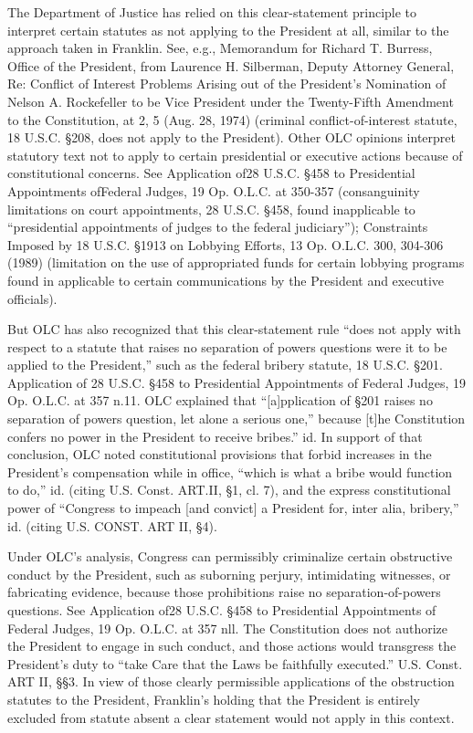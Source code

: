 The Department of Justice has relied on this clear-statement principle to interpret certain statutes as not applying to the President at all, similar to the approach taken in Franklin.
See, e.g., Memorandum for Richard T. Burress, Office of the President, from Laurence H. Silberman, Deputy Attorney General, Re: Conflict of Interest Problems Arising out of the President's Nomination of Nelson A. Rockefeller to be Vice President under the Twenty-Fifth Amendment to the Constitution, at 2, 5 (Aug. 28, 1974) (criminal conflict-of-interest statute, 18 U.S.C. \S 208, does not apply to the President).
Other OLC opinions interpret statutory text not to apply to certain presidential or executive actions because of constitutional concerns.
See Application of28 U.S.C. \S 458 to Presidential Appointments ofFederal Judges, 19 Op. O.L.C. at 350-357 (consanguinity limitations on court appointments, 28 U.S.C. \S 458, found inapplicable to “presidential appointments of judges to the federal judiciary”);
Constraints Imposed by 18 U.S.C. \S 1913 on Lobbying Efforts, 13 Op. O.L.C. 300, 304-306 (1989) (limitation on the use of appropriated funds for certain lobbying programs found in applicable to certain communications by the President and executive officials).

But OLC has also recognized that this clear-statement rule “does not apply with respect to a statute that raises no separation of powers questions were it to be applied to the President,” such as the federal bribery statute, 18 U.S.C. \S 201.
Application of 28 U.S.C. \S 458 to Presidential Appointments of Federal Judges, 19 Op. O.L.C. at 357 n.11. OLC explained that “[a]pplication of \S 201 raises no separation of powers question, let alone a serious one,” because [t]he Constitution confers no power in the President to receive bribes.” id.
In support of that conclusion, OLC noted constitutional provisions that forbid increases in the President’s compensation while in office, “which is what a bribe would function to do,” id. (citing U.S. Const. ART.II, \S 1, cl. 7), and the express constitutional power of “Congress to impeach [and convict] a President for, inter alia, bribery,” id. (citing U.S. CONST. ART II, \S 4).

Under OLC’s analysis, Congress can permissibly criminalize certain obstructive conduct by the President, such as suborning perjury, intimidating witnesses, or fabricating evidence, because those prohibitions raise no separation-of-powers questions.
See Application of28 U.S.C. \S 458 to Presidential Appointments of Federal Judges, 19 Op. O.L.C. at 357 nll.
The Constitution does not authorize the President to engage in such conduct, and those actions would transgress the President’s duty to “take Care that the Laws be faithfully executed.” U.S. Const. ART II, \S\S 3.
In view of those clearly permissible applications of the obstruction statutes to the President, Franklin’s holding that the President is entirely excluded from statute absent a clear statement would not apply in this context.

